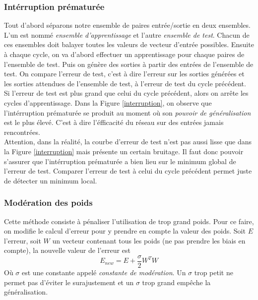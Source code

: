 \subsubsection*{Intérruption prématurée}
Tout d'abord séparons notre ensemble de paires entrée/sortie en deux ensembles.
L'un est nommé \emph{ensemble d'apprentissage} et l'autre \emph{ensemble de test}.
Chacun de ces ensembles doit balayer toutes les valeurs de vecteur d'entrée possibles.
Ensuite à chaque cycle, on va d'abord effectuer un apprentissage pour chaque paires de l'ensemble de test.
Puis on génère des sorties à partir des entrées de l'ensemble de test.
On compare l'erreur de test, c'est à dire l'erreur sur les sorties générées et les sorties attendues de l'ensemble de test, à l'erreur de test du cycle précédent.
Si l'erreur de test est plus grand que celui du cycle précédent, alors on arrête les cycles d'apprentissage.
Dans la Figure \ref{interruption}, on observe que l'intérruption prématurée se produit au moment où son \emph{pouvoir de généralisation} est le plus élevé.
C'est à dire l'éfficacité du réseau sur des entrées jamais rencontrées.\\

Attention, dans la réalité, la courbe d'erreur de test n'est pas aussi lisse que dans la Figure \ref{interruption} mais présente un certain bruitage.
Il faut donc pouvoir s'assurer que l'intérruption prématurée a bien lieu sur le minimum global de l'erreur de test.
Comparer l'erreur de test à celui du cycle précédent permet juste de détecter un minimum local.
\subsubsection*{Modération des poids}
Cette méthode consiste à pénaliser l'utilisation de trop grand poids.
Pour ce faire, on modifie le calcul d'erreur pour y prendre en compte la valeur des poids.\cite{statistica}
Soit $E$ l'erreur, soit $W$ un vecteur contenant tous les poids (ne pas prendre les biais en compte), la nouvelle valeur de l'erreur est \[E_{new} = E + \frac{\sigma}{2}W^{T}W\]
Où $\sigma$ est une constante appelé \emph{constante de modération}.
Un $\sigma$ trop petit ne permet pas d'éviter le surajustement et un $\sigma$ trop grand empêche la généralisation.